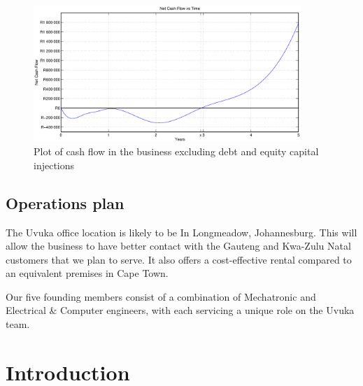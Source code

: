 \begin{figure}[H]
\centering
\includegraphics[width=0.9\textwidth]{images/cashflow_plot}
\caption[Cash-flow plot]{Plot of cash flow in the business excluding debt and equity capital injections}
\label{fig:exam}
\end{figure}


\section*{Operations plan}
The Uvuka office location is likely to be In Longmeadow, Johannesburg. This will allow the business to have better contact with the Gauteng and Kwa-Zulu Natal customers that we plan to serve. It also offers a cost-effective rental compared to an equivalent premises in Cape Town.

Our five founding members consist of a combination of Mechatronic and Electrical \& Computer engineers, with each servicing a unique role on the Uvuka team. 

\cleardoublepage
{}
{}

\newpage

\cleardoublepage
{}
{}
\listoffigures
\newpage

\chapter{Introduction}


